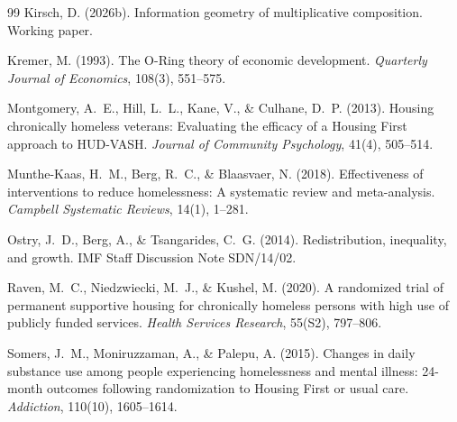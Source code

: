 \documentclass[12pt]{article}
\begin{document}
\begin{thebibliography}{99}
Kirsch, D. (2026b).
Information geometry of multiplicative composition.
Working paper.

Kremer, M. (1993).
The O-Ring theory of economic development.
\emph{Quarterly Journal of Economics}, 108(3), 551--575.

Montgomery, A.~E., Hill, L.~L., Kane, V., \& Culhane, D.~P. (2013).
Housing chronically homeless veterans: Evaluating the efficacy of a Housing First approach to HUD-VASH.
\emph{Journal of Community Psychology}, 41(4), 505--514.

Munthe-Kaas, H.~M., Berg, R.~C., \& Blaasvaer, N. (2018).
Effectiveness of interventions to reduce homelessness: A systematic review and meta-analysis.
\emph{Campbell Systematic Reviews}, 14(1), 1--281.

Ostry, J.~D., Berg, A., \& Tsangarides, C.~G. (2014).
Redistribution, inequality, and growth.
IMF Staff Discussion Note SDN/14/02.

Raven, M.~C., Niedzwiecki, M.~J., \& Kushel, M. (2020).
A randomized trial of permanent supportive housing for chronically homeless persons with high use of publicly funded services.
\emph{Health Services Research}, 55(S2), 797--806.

Somers, J.~M., Moniruzzaman, A., \& Palepu, A. (2015).
Changes in daily substance use among people experiencing homelessness and mental illness: 24-month outcomes following randomization to Housing First or usual care.
\emph{Addiction}, 110(10), 1605--1614.

\end{thebibliography}
\end{document}
